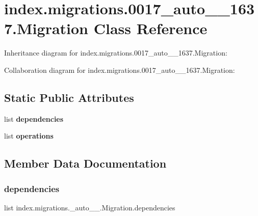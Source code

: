 \hypertarget{classindex_1_1migrations_1_10017__auto__20171025__1637_1_1Migration}{}\section{index.\+migrations.0017\+\_\+auto\+\_\+\_\+1637.Migration Class Reference}
\label{classindex_1_1migrations_1_10017__auto__20171025__1637_1_1Migration}


Inheritance diagram for index.\+migrations.0017\+\_\+auto\+\_\+\_\+1637.Migration\+:


Collaboration diagram for index.\+migrations.0017\+\_\+auto\+\_\+\_\+1637.Migration\+:
\subsection*{Static Public Attributes}
\begin{DoxyCompactItemize}
\item 
list {\bfseries dependencies}
\item 
list {\bfseries operations}
\end{DoxyCompactItemize}


\subsection{Member Data Documentation}
\mbox{\label{classindex_1_1migrations_1_10017__auto__20171025__1637_1_1Migration_a92346e36eb725d1c12d7ece5c3c44d25}} 
\subsubsection{\texorpdfstring{dependencies}{dependencies}}
{\footnotesize\ttfamily list index.\+migrations.\+\_\+auto\+\_\+\_.\+Migration.\+dependencies\hspace{0.3cm}{\ttfamily [static]}}

